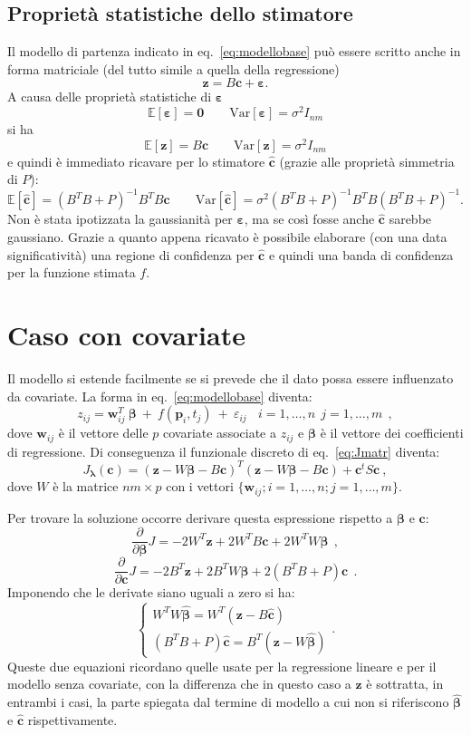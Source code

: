 \documentclass[a4paper,11pt,twoside,openright]{book}							%
\begin{document}
\subsection{Proprietà statistiche dello stimatore}
Il modello di partenza indicato in eq.~\ref{eq:modellobase} può essere scritto anche in forma matriciale (del tutto simile a quella della regressione)
\begin{equation}
\label{eq:modellobasematric}
\bm z=B \bm c + \bm \varepsilon .
\end{equation}
A causa delle proprietà statistiche di $\bm \varepsilon$
$$
\mathbb{E}[\bm \varepsilon] = \bm 0 \qquad \mathrm{Var}[\bm \varepsilon] = \sigma^2 I_{nm}
$$
si ha
$$
\mathbb{E}[\bm z] = B \bm c \qquad \mathrm{Var}[\bm z] = \sigma^2 I_{nm}
$$
e quindi è immediato ricavare per lo stimatore $\hat  {\bm c}$ (grazie alle proprietà simmetria di $P$):
$$
\mathbb{E}[\hat  {\bm c}] = (B^T B + P)^{-1}B^TB \bm c \qquad \mathrm{Var}[\hat  {\bm c}] = \sigma^2 (B^T B + P)^{-1}B^TB(B^T B + P)^{-1} .
$$
Non è stata ipotizzata la gaussianità per $\bm \varepsilon$, ma se così fosse anche $\hat  {\bm c}$ sarebbe gaussiano. Grazie a quanto appena ricavato è possibile elaborare (con una data significatività) una regione di confidenza per $\hat  {\bm c}$ e quindi una banda di confidenza per la funzione stimata $f$.


\section{Caso con covariate}
\label{sez:beta}
Il modello si estende facilmente se si prevede che il dato possa essere influenzato da covariate. La forma in eq.~\ref{eq:modellobase} diventa:
\begin{equation}
\label{eq:modellobasecovar}
z_{ij}= \bm w_{ij}^T\  \bm \beta   \ + \  f(\bm p_i,t_j)\ +\ \varepsilon_{ij}\ \ \ \ i = 1,\ldots,n\ \ j=1,\ldots,m \ \ ,
\end{equation}
dove $\bm w_{ij}$ è il vettore delle $p$ covariate associate a $z_{ij}$ e $\bm \beta$ è il vettore dei coefficienti di regressione. Di conseguenza il funzionale discreto di eq.~\ref{eq:Jmatr} diventa:
$$ J_{\bm \lambda }(\bm c) = (\bm z - W \bm \beta - B \bm c)^T (\bm z - W \bm \beta - B \bm c) + \bm c^t S \bm c  \ ,$$
dove $W$ è la matrice $nm \times p$ con i vettori $ \{\bm w_{ij}; i=1,\ldots,n;j=1,\ldots,m\}$.

Per trovare la soluzione occorre derivare questa espressione rispetto a $\bm \beta$ e $\bm c$:
$$
\frac{\partial}{\partial \bm \beta}J= -2W^T \bm z + 2W^T B \bm c + 2 W^TW \bm \beta \ \ ,
$$
$$
\frac{\partial}{\partial \bm c}J= -2 B^T \bm z + 2 B^T W \bm \beta + 2(B^T B + P) \bm c \ \ .
$$
Imponendo che le derivate siano uguali a zero si ha:
$$
\begin{cases}
W^TW \hat{\bm \beta} = W^T(\bm z - B \hat{\bm c})  \\
(B^T B + P) \hat{\bm c}=B^T(\bm z -W \hat{\bm \beta})
\end{cases}.
$$
Queste due equazioni ricordano quelle usate per la regressione lineare e per il modello senza covariate, con la differenza che in questo caso a $\bm z$ è sottratta, in entrambi i casi, la parte spiegata dal termine di modello a cui non si riferiscono $\hat{\bm \beta}$ e $\hat{\bm c}$ rispettivamente.
\end{document}
